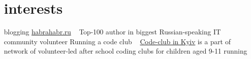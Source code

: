 \documentclass[hidelinks,a4paper]{cv}
\begin{document}
\section{interests}
\begin{entrylist}
   \entry
    {blogging}
    {\href{http://habrahabr.ru/users/patapsmile/}{habrahabr.ru}}
    {~}
    {Top-100 author in biggest Russian-speaking IT community}
   \entry
    {volunteer}
    {Running a code club}
    {~}
    {\href{https://www.codeclub.org.uk/}{Code-club in Kyiv} is a part of network of volunteer-led after school coding clubs for children aged 9-11}
   \entry
    {running}
    {~}
    {~}
    {~}
\end{entrylist}
\end{document}
